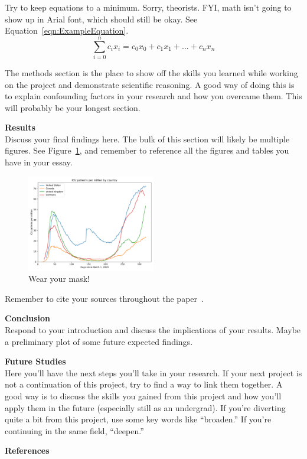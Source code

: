 \documentclass[12pt, letterpaper, twocolumn]{article}
\begin{document}
Try to keep equations to a minimum. Sorry, theorists. FYI, math isn't going to show up in Arial font, which should still be okay. See Equation~\ref{eqn:ExampleEquation}.
\begin{equation}
    \sum_{i=0}^n c_i x_i = c_0 x_0 + c_1 x_1 + ... + c_n x_n
\label{eqn:ExampleEquation}
\end{equation}

The methods section is the place to show off the skills you learned while working on the project and demonstrate scientific reasoning. A good way of doing this is to explain confounding factors in your research and how you overcame them. This will probably be your longest section.

\vspace{0.125in}
\noindent\textbf{Results}\\
Discuss your final findings here. The bulk of this section will likely be multiple figures. See Figure~\ref{fig:AnotherFigure}, and remember to reference all the figures and tables you have in your essay.

\begin{figure}[ht]
    \centering
    \includegraphics[width=0.5\textwidth]{img/icu_patients.pdf}
    \caption{Wear your mask!}
    \label{fig:AnotherFigure}
\end{figure}

Remember to cite your sources throughout the paper~\cite{this_article}.

\vspace{0.125in}
\noindent\textbf{Conclusion}\\
Respond to your introduction and discuss the implications of your results. Maybe a preliminary plot of some future expected findings.

\vspace{0.125in}
\noindent\textbf{Future Studies}\\
Here you'll have the next steps you'll take in your research. If your next project is not a continuation of this project, try to find a way to link them together. A good way is to discuss the skills you gained from this project and how you'll apply them in the future (especially still as an undergrad). If you're diverting quite a bit from this project, use some key words like ``broaden.'' If you're continuing in the same field, ``deepen.''

\vspace{0.125in}
\noindent\textbf{References}
\vspace{-0.125in}
\printbibliography[heading=none]
\end{document}
